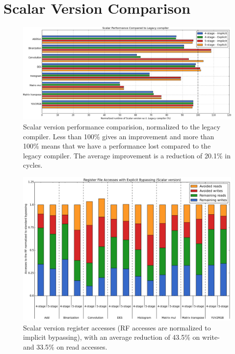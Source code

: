 \section{Scalar Version Comparison}
\begin{figure}[b!]
\centering
\hspace*{-.12in}
\includegraphics[width=\textwidth]{figures/stats/scalar_cycles}
\caption{Scalar version performance comparision, normalized to the legacy compiler. Less than 100\% gives an improvement and more than 100\% means that we have a performance lost compared to the legacy compiler. The average improvement is a reduction of 20.1\% in cycles.}
\label{fig:legacy_scalar_cmp}
\end{figure}

\begin{figure}[t!]
\centering
\hspace*{-.12in}
\includegraphics[width=.875\textwidth]{figures/stats/scalar_accesses}
\caption{Scalar version register accesses (RF accesses are normalized to implicit bypassing), with an average reduction of 43.5\% on write- and 33.5\% on read accesses.}
\label{fig:scalar_improvements}
\end{figure}

